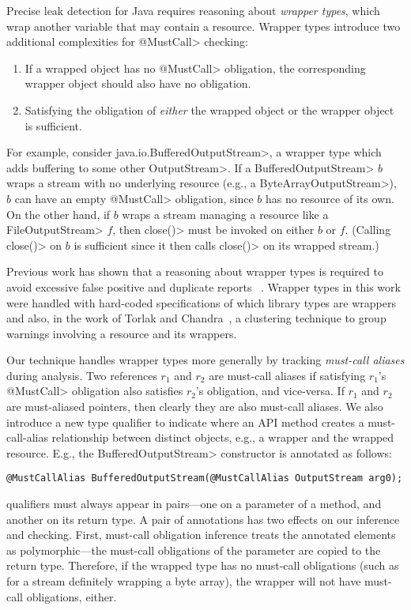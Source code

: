 Precise leak detection for Java requires reasoning about \emph{wrapper types},
which wrap another variable that may contain a resource.  Wrapper types
introduce two additional complexities for \<@MustCall> checking:
\begin{enumerate}
  \item If a wrapped object has no \<@MustCall> obligation, the corresponding
  wrapper object should also have no obligation.
  \item Satisfying the obligation of \emph{either} the wrapped object or the
  wrapper object is sufficient.
\end{enumerate}
For example, consider \<java.io.BufferedOutputStream>, a wrapper type which adds
buffering to some other \<OutputStream>.  If a \<BufferedOutputStream> $b$ wraps
a stream with no underlying resource (e.g., a \<ByteArrayOutputStream>), $b$ can
have an empty \<@MustCall> obligation, since $b$ has no resource of its own.  On
the other hand, if $b$ wraps a stream managing a resource like a
\<FileOutputStream> $f$, then \<close()> must be invoked on either $b$ or $f$.
(Calling \<close()> on $b$ is sufficient since it then calls \<close()> on its
wrapped stream.)

Previous work has shown that a reasoning about wrapper types is required to
avoid excessive false positive and duplicate reports~\cite{TorlakC10} .  Wrapper types in this work were handled with hard-coded specifications of
which library types are wrappers and also, in the work of Torlak and
Chandra~\cite{TorlakC10}, a clustering technique to group warnings involving a
resource and its wrappers.  

Our technique handles wrapper types more generally by tracking \emph{must-call
aliases} during analysis.  Two references $r_1$ and $r_2$ are must-call aliases
if satisfying $r_1$'s \<@MustCall> obligation also satisfies $r_2$'s
obligation, and vice-versa.  If $r_1$ and $r_2$ are must-aliased pointers, then
clearly they are also must-call aliases.  We also introduce a new type
qualifier \mccannot to indicate where an API method creates a must-call-alias
relationship between distinct objects, e.g., a wrapper and the wrapped resource.
E.g., the \<BufferedOutputStream> constructor is annotated as follows:
\begin{lstlisting}
@MustCallAlias BufferedOutputStream(@MustCallAlias OutputStream arg0);
\end{lstlisting}

\mccannot qualifiers must always appear in pairs---one on a parameter of a
method, and another on its return type.  A pair of \mccannot annotations has two
effects on our inference and checking.  First, must-call obligation inference
treats the annotated elements as polymorphic---the must-call obligations of the
parameter are copied to the return type. Therefore, if the wrapped type has no
must-call obligations (such as for a stream definitely wrapping a byte array),
the wrapper will not have must-call obligations, either.

